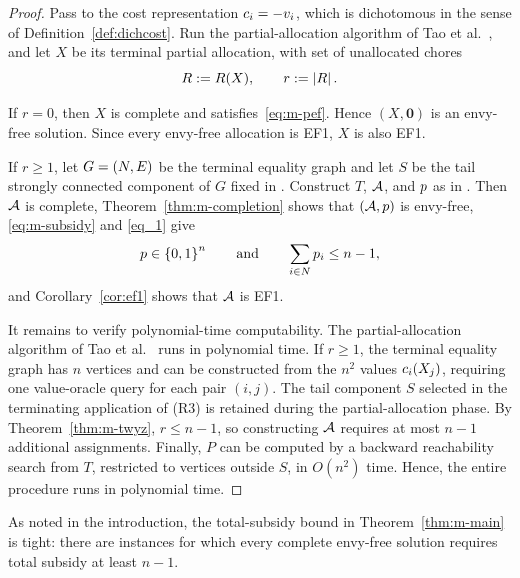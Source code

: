 \begin{proof}
Pass to the cost representation $c_i=-v_i$, which is dichotomous in
the sense of Definition~\ref{def:dichcost}. Run the partial-allocation algorithm of Tao et al.~\cite{tao2025existence}, and let $X$ be its terminal partial
allocation, with set of unallocated chores
\[
    R:=R(X), \qquad r:=\left\lvert R\right\rvert.
\]

If $r=0$, then $X$ is complete and satisfies~\eqref{eq:m-pef}.
Hence $(X,\mathbf 0)$ is an envy-free solution. Since every envy-free
allocation is EF1, $X$ is also EF1.

If $r\geq 1$, let $G=(N,E)$ be the terminal equality graph and let $S$ be the tail strongly connected component of $G$ fixed in . Construct $T$, $\mathcal{A}$, and $p$ as in . Then $\mathcal{A}$ is complete, Theorem~\ref{thm:m-completion} shows that $(\mathcal{A},p)$ is envy-free, \eqref{eq:m-subsidy} and \eqref{eq_1} give
\[
    p\in\left\{0,1\right\}^n
    \qquad\text{and}\qquad
    \sum_{i\in N}p_i\leq n-1,
\]
and Corollary~\ref{cor:ef1} shows that $\mathcal{A}$ is EF1.

It remains to verify polynomial-time computability. The partial-allocation algorithm of Tao et al.~\cite{tao2025existence} runs in polynomial time. If $r\geq 1$, the
terminal equality graph has $n$ vertices and can be constructed from
the $n^2$ values $c_i(X_j)$, requiring one value-oracle query for
each pair $(i,j)$. The tail component $S$ selected in the terminating application of \textnormal{(R3)} is retained during the partial-allocation phase.
By Theorem~\ref{thm:m-twyz},
$r\leq n-1$, so constructing $\mathcal{A}$ requires at most $n-1$ additional
assignments. Finally, $P$ can be computed by a backward reachability
search from $T$, restricted to vertices outside $S$, in $O(n^2)$ time. Hence, the entire procedure runs in polynomial time.
\end{proof}

As noted in the introduction, the total-subsidy bound in Theorem~\ref{thm:m-main} is tight: there are instances for which every complete envy-free solution requires total subsidy at least \(n-1\).




